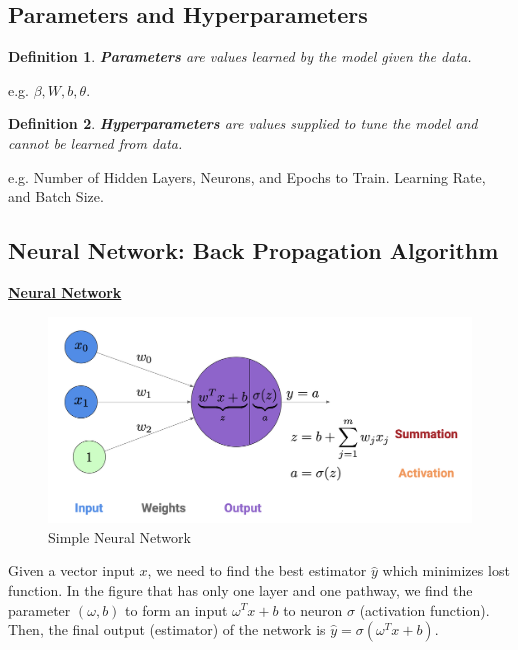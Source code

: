 \documentclass[11pt,a4paper]{article}
\newtheorem{definition}{Definition}
\begin{document}
\subsection{Parameters and Hyperparameters}
\begin{definition}
    \textbf{Parameters} are values learned by the model given the data.
\end{definition}
e.g. $\beta, W, b, \theta$.
\begin{definition}
    \textbf{Hyperparameters} are values supplied to tune the model and cannot be learned from data.
\end{definition}
e.g. Number of Hidden Layers, Neurons, and Epochs to Train. Learning Rate, and Batch Size.

\subsection{Neural Network: Back Propagation Algorithm}
\underline{\textbf{Neural Network}}
\begin{center}\begin{figure}[htbp]
    \centering
    \includegraphics[scale=0.2]{neuron1.png}
    \caption{Simple Neural Network}
    \label{}
\end{figure}\end{center}
Given a vector input $x$, we need to find the best estimator $\hat{y}$ which minimizes lost function. In the figure that has only one layer and one pathway, we find the parameter $(\omega,b)$ to form an input $\omega^Tx+b$ to neuron $\sigma$ (activation function).  Then, the final output (estimator) of the network is $\hat{y}=\sigma(\omega^Tx+b)$.
\end{document}
